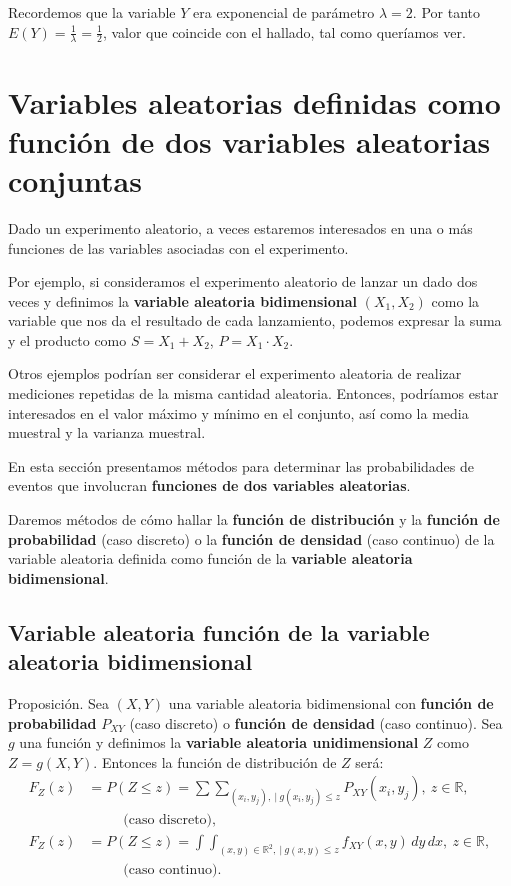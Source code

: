 \documentclass[]{book}
\begin{document}
Recordemos que la variable \(Y\) era exponencial de parámetro \(\lambda=2\). Por tanto \(E(Y)=\frac{1}{\lambda}=\frac{1}{2}\), valor que coincide con el hallado, tal como queríamos ver.

\hypertarget{variables-aleatorias-definidas-como-funciuxf3n-de-dos-variables-aleatorias-conjuntas}{%
\section{Variables aleatorias definidas como función de dos variables aleatorias conjuntas}\label{variables-aleatorias-definidas-como-funciuxf3n-de-dos-variables-aleatorias-conjuntas}}

Dado un experimento aleatorio, a veces estaremos interesados en una o más funciones de las variables asociadas con el experimento.

Por ejemplo, si consideramos el experimento aleatorio de lanzar un dado dos veces y definimos la \textbf{variable aleatoria bidimensional} \((X_1,X_2)\) como la variable que nos da el resultado de cada lanzamiento, podemos expresar la suma y el producto como \(S=X_1+X_2\), \(P=X_1\cdot X_2\).

Otros ejemplos podrían ser considerar el experimento aleatoria de realizar mediciones repetidas de la misma cantidad aleatoria. Entonces, podríamos estar interesados en el valor máximo y mínimo en el conjunto, así como la media muestral y la varianza muestral.

En esta sección presentamos métodos para determinar las probabilidades de eventos que involucran \textbf{funciones de dos variables aleatorias}.

Daremos métodos de cómo hallar la \textbf{función de distribución} y la \textbf{función de probabilidad} (caso discreto) o la \textbf{función de densidad} (caso continuo) de la variable aleatoria definida como función de la \textbf{variable aleatoria bidimensional}.

\hypertarget{variable-aleatoria-funciuxf3n-de-la-variable-aleatoria-bidimensional}{%
\subsection{Variable aleatoria función de la variable aleatoria bidimensional}\label{variable-aleatoria-funciuxf3n-de-la-variable-aleatoria-bidimensional}}

Proposición.
Sea \((X,Y)\) una variable aleatoria bidimensional con \textbf{función de probabilidad} \(P_{XY}\) (caso discreto) o \textbf{función de densidad} (caso continuo). Sea \(g\) una función y definimos la \textbf{variable aleatoria unidimensional} \(Z\) como \(Z=g(X,Y)\). Entonces la función de distribución de \(Z\) será:
\[
\begin{array}{rl}
F_Z(z) & = P(Z\leq z)=\sum\sum_{(x_i,y_j),\ |\ g(x_i,y_j)\leq z} P_{XY}(x_i,y_j),\ z\in\mathbb{R},\\ &\ \qquad\mbox{ (caso discreto),}\\
F_Z(z) & = P(Z\leq z)=\int\int_{(x,y)\in\mathbb{R}^2,\ |\ g(x,y)\leq z} f_{XY}(x,y)\,dy\, dx, \ z\in\mathbb{R},\\ &\ \qquad\mbox{ (caso continuo).}
\end{array}
\]
\end{document}
